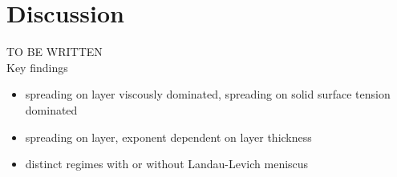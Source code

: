\documentclass[aip,graphicx]{revtex4-1}
\begin{document}
\section{Discussion}
TO BE WRITTEN\\
Key findings

\begin{itemize}
 \item spreading on layer viscously dominated, spreading on solid
   surface tension dominated
 \item spreading on layer, exponent dependent on layer thickness
 \item distinct regimes with or without Landau-Levich meniscus
\end{itemize}



%
%

%



\end{document}
